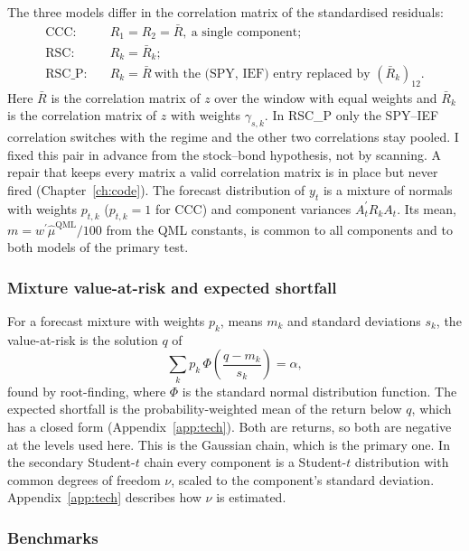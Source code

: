 The three models differ in the correlation matrix of the standardised residuals:
\begin{align}
\text{CCC:}&\quad R_1=R_2=\bar R,\ \text{a single component};\\
\text{RSC:}&\quad R_k=\bar R_k;\\
\text{RSC\_P:}&\quad R_k=\bar R\ \text{with the (SPY, IEF) entry replaced by } (\bar R_k)_{12}.
\end{align}
Here $\bar R$ is the correlation matrix of $z$ over the window with equal weights and $\bar R_k$ is the correlation matrix of $z$ with weights $\gamma_{s,k}$. In RSC\_P only the SPY--IEF correlation switches with the regime and the other two correlations stay pooled. I fixed this pair in advance from the stock--bond hypothesis, not by scanning. A repair that keeps every matrix a valid correlation matrix is in place but never fired (Chapter~\ref{ch:code}). The forecast distribution of $y_t$ is a mixture of normals with weights $p_{t,k}$ ($p_{t,k}=1$ for CCC) and component variances $A_t^\prime R_k A_t$. Its mean, $m=w^\prime\hat\mu^{\mathrm{QML}}/100$ from the QML constants, is common to all components and to both models of the primary test.

\subsubsection{Mixture value-at-risk and expected shortfall}\label{sec:mixvar}

For a forecast mixture with weights $p_k$, means $m_k$ and standard deviations $s_k$, the value-at-risk is the solution $q$ of
\begin{equation}
\sum_k p_k\,\Phi\!\left(\frac{q-m_k}{s_k}\right)=\alpha,
\end{equation}
found by root-finding, where $\Phi$ is the standard normal distribution function. The expected shortfall is the probability-weighted mean of the return below $q$, which has a closed form (Appendix~\ref{app:tech}). Both are returns, so both are negative at the levels used here. This is the Gaussian chain, which is the primary one. In the secondary Student-$t$ chain every component is a Student-$t$ distribution with common degrees of freedom $\nu$, scaled to the component's standard deviation. Appendix~\ref{app:tech} describes how $\nu$ is estimated.

\subsubsection{Benchmarks}\label{sec:bench}

